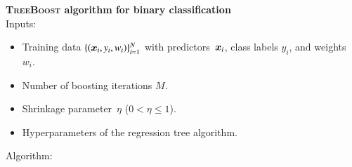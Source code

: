 \vspace{11pt}
\noindent\textbf{\textsc{TreeBoost} algorithm for binary classification} \\[11pt]
\noindent Inputs:
\begin{itemize}[itemsep=2pt]
\item Training data $\{(\bm{x}_i, y_i, w_i)\}_{i = 1}^{N}$ with
  predictors~$\bm{x}_i$, class labels $y_i$, and weights~$w_i$.
\item Number of boosting iterations $M$.
\item Shrinkage parameter~$\eta$ ($0 < \eta \leq 1$).
\item Hyperparameters of the regression tree algorithm.
\end{itemize}

\vspace{6pt}
\noindent Algorithm:
